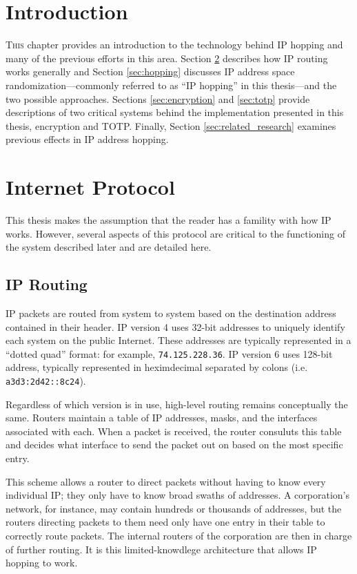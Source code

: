 \section{Introduction}
\lettrine{T}{his} chapter provides an introduction to the technology behind \ac{IP} hopping and many of the previous efforts in this area. Section \ref{sec:ip} describes how \ac{IP} routing works generally and Section \ref{sec:hopping} discusses IP address space randomization---commonly referred to as ``\ac{IP} hopping'' in this thesis---and the two possible approaches. Sections \ref{sec:encryption} and \ref{sec:totp} provide descriptions of two critical systems behind the implementation presented in this thesis, encryption and \ac{TOTP}. Finally, Section \ref{sec:related_research} examines previous effects in \ac{IP} address hopping.

\section{Internet Protocol}
\label{sec:ip}
\par This thesis makes the assumption that the reader has a famility with how \ac{IP} works. However, several aspects of this protocol are critical to the functioning of the system described later and are detailed here. 

\subsection{IP Routing}
\label{sec:routing}
\par IP packets are routed from system to system based on the destination address contained in their header. IP version 4 uses 32-bit addresses to uniquely identify each system on the public Internet. These addresses are typically represented in a ``dotted quad'' format: for example, \texttt{74.125.228.36}. IP version 6 uses 128-bit address, typically represented in heximdecimal separated by colons (i.e. \texttt{a3d3:2d42::8c24}).

\par Regardless of which version is in use, high-level routing remains conceptually the same. Routers maintain a table of \ac{IP} addresses, masks, and the interfaces associated with each. When a packet is received, the router consuluts this table and decides what interface to send the packet out on based on the most specific entry.  

\par This scheme allows a router to direct packets without having to know every individual IP; they only have to know broad swaths of addresses. A corporation's network, for instance, may contain hundreds or thousands of addresses, but the routers directing packets to them need only have one entry in their table to correctly route packets. The internal routers of the corporation are then in charge of further routing. It is this limited-knowdlege architecture that allows IP hopping to work.

